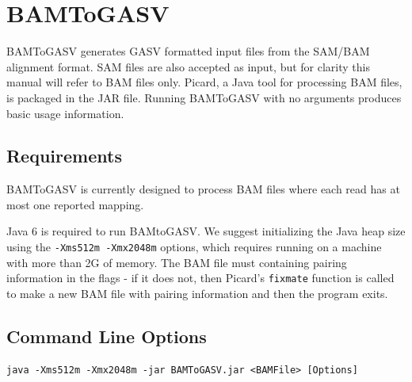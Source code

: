 \documentclass[11pt]{article}
\begin{document}
\section{BAMToGASV}

BAMToGASV generates GASV formatted input files from the SAM/BAM alignment format. SAM files are also accepted as input, but for clarity this manual will refer to BAM files only.  Picard, a Java tool for processing BAM files, is packaged in the JAR file. Running BAMToGASV with no arguments produces basic usage information.

\subsection{Requirements}
   
BAMToGASV is currently designed to process BAM files where each read has at most one reported mapping. 

 Java 6 is required to run BAMtoGASV.  We suggest initializing the Java heap size using the \texttt{-Xms512m -Xmx2048m} options, which requires running on a machine with more than 2G of memory.  The BAM file must containing pairing information in the flags - if it does not, then Picard's \texttt{fixmate} function is called to make a new BAM file with pairing information and then the program exits.  

\subsection{Command Line Options}
\label{sec:BTGCLO}

\begin{Verbatim}[frame=single]
java -Xms512m -Xmx2048m -jar BAMToGASV.jar <BAMFile> [Options]
\end{Verbatim}
     
\end{document}

